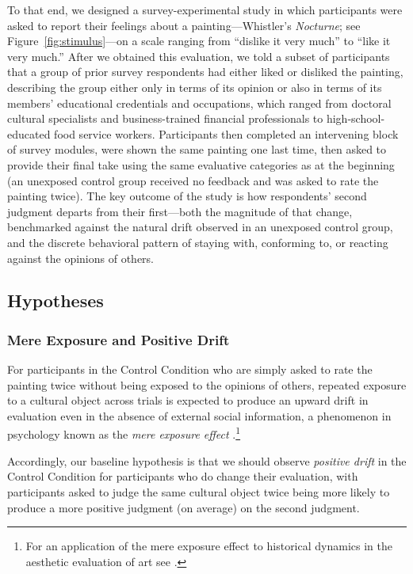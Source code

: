 \documentclass[12pt, letterpaper]{article}
\begin{document}
To that end, we designed a survey-experimental study in which participants were asked to report their feelings about a painting---Whistler's \textit{Nocturne}; see Figure~\ref{fig:stimulus}---on a scale ranging from ``dislike it very much'' to ``like it very much.'' After we obtained this evaluation, we told a subset of participants that a group of prior survey respondents had either liked or disliked the painting, describing the group either only in terms of its opinion or also in terms of its members' educational credentials and occupations, which ranged from doctoral cultural specialists and business-trained financial professionals to high-school-educated food service workers. Participants then completed an intervening block of survey modules, were shown the same painting one last time, then asked to provide their final take using the same evaluative categories as at the beginning (an unexposed control group received no feedback and was asked to rate the painting twice). The key outcome of the study is how respondents' second judgment departs from their first---both the magnitude of that change, benchmarked against the natural drift observed in an unexposed control group, and the discrete behavioral pattern of staying with, conforming to, or reacting against the opinions of others.

\subsection{Hypotheses}
\subsubsection{Mere Exposure and Positive Drift}
For participants in the Control Condition who are simply asked to rate the painting twice without being exposed to the opinions of others, repeated exposure to a cultural object across trials is expected to produce an upward drift in evaluation even in the absence of external social information, a phenomenon in psychology known as the \textit{mere exposure effect} \citep{zajonc1968attitudinal, reber1998effects-efe}.\footnote{For an application of the mere exposure effect to historical dynamics in the aesthetic evaluation of art see \citet{cutting2003gustave}.} 

Accordingly, our baseline hypothesis is that we should observe \textit{positive drift} in the Control Condition for participants who do change their evaluation, with participants asked to judge the same cultural object twice being more likely to produce a more positive judgment (on average) on the second judgment. 
\end{document}
